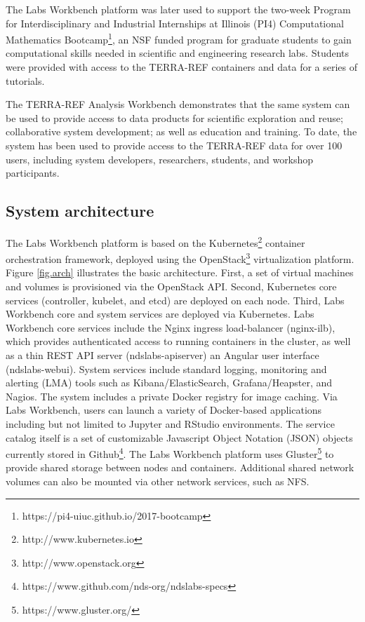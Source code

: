 \documentclass{sig-alternate}
\begin{document}
The Labs Workbench platform was later used to support the two-week Program for Interdisciplinary and Industrial Internships at Illinois (PI4) Computational Mathematics Bootcamp\footnote{\small https://pi4-uiuc.github.io/2017-bootcamp}, an NSF funded program for graduate students to gain computational skills needed in scientific and engineering research labs. Students were provided with access to the TERRA-REF containers and data for a series of tutorials.

The TERRA-REF Analysis Workbench demonstrates that the same system can be used to provide access to data products for scientific exploration and reuse; collaborative system development; as well as education and training. To date, the system has been used to provide access to the TERRA-REF data for over 100 users, including system developers, researchers, students, and workshop participants.


\subsection{System architecture}

The Labs Workbench platform is based on the Kubernetes\footnote{\small http://www.kubernetes.io} container orchestration framework, deployed using the OpenStack\footnote{\small http://www.openstack.org} virtualization platform. Figure \ref{fig.arch} illustrates the basic architecture. First, a set of virtual machines and volumes is provisioned via the OpenStack API. Second, Kubernetes core services (controller, kubelet, and etcd) are deployed on each node. Third, Labs Workbench core and system services are deployed via Kubernetes. Labs Workbench core services include the Nginx ingress load-balancer (nginx-ilb), which provides authenticated access to running containers in the cluster, as well as a thin REST API server (ndslabs-apiserver) an Angular user interface (ndslabs-webui). System services include standard logging, monitoring and alerting (LMA) tools such as Kibana/ElasticSearch, Grafana/Heapster, and Nagios.  The system includes a private Docker registry for image caching.  Via Labs Workbench, users can launch a variety of Docker-based applications including but not limited to Jupyter and RStudio environments. The service catalog itself is a set of customizable Javascript Object Notation (JSON) objects currently stored in Github\footnote{https://www.github.com/nds-org/ndslabs-specs}. The Labs Workbench platform uses Gluster\footnote{https://www.gluster.org/} to provide shared storage between nodes and containers. Additional shared network volumes can also be mounted via other network services, such as NFS.
\end{document}
